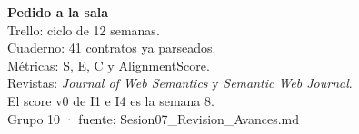 \documentclass[aspectratio=169,12pt]{beamer}
\begin{document}
\begin{frame}[plain]
  \vspace{0.9em}
  {\color{uniaccent}\large\bfseries Pedido a la sala}\\[0.65em]
  {\large\color{white}
  Trello: ciclo de 12 semanas.\\[0.28em]
  Cuaderno: 41 contratos ya parseados.\\[0.28em]
  Métricas: S, E, C y AlignmentScore.\\[0.28em]
  Revistas: \emph{Journal of Web Semantics} y \emph{Semantic Web Journal}.}\\[0.7em]
  {\large\color{uniaccent} El score v0 de I1 e I4 es la semana 8.}\\[0.9em]
  {\color{white!70} Grupo 10 · fuente: Sesion07\_Revision\_Avances.md}
\end{frame}
\end{document}
